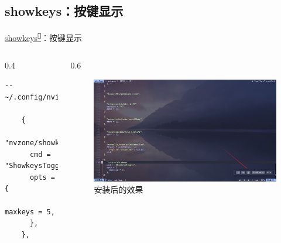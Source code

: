 \documentclass[aspectratio=169]{ctexbeamer}
\newcommand{\nerd}[1]{\texttt{#1}}
\newcommand{\link}[3][]{\href{#3}{#2\textsuperscript{\nerd{}}}}
\begin{document}
\subsection{showkeys：按键显示}
\begin{frame}[fragile]{\link{showkeys}{https://github.com/nvzone/showkeys}：按键显示}
  \begin{columns}
    \begin{column}{0.4\linewidth}
        \begin{lstlisting}[basicstyle=\tiny\ttfamily]
    -- ~/.config/nvim/lua/plugins/ui.lua

    {
      "nvzone/showkeys",
      cmd = "ShowkeysToggle",
      opts = {
        maxkeys = 5,
      },
    },
        \end{lstlisting}
    \end{column}

    \begin{column}{0.6\linewidth}
      \begin{figure}[H]
        \centering
        \includegraphics[width=\linewidth]{./Figures/Showkeys_Finish.jpg}
        \caption{安装后的效果}%
      \end{figure}
    \end{column}
  \end{columns}
\end{frame}
\end{document}
